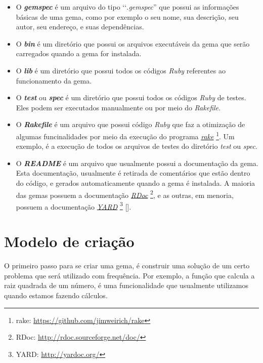 \begin{itemize}

 \item O \emph{\textbf{gemspec}} é um arquivo do tipo ‘‘\emph{.gemspec}'' que possui as informações básicas
 de uma gema, como por exemplo o seu nome, sua descrição, seu autor, seu endereço, e suas dependências.

 \item O \emph{\textbf{bin}} é um diretório que possui os arquivos executáveis da gema que serão
 carregados quando a gema for instalada.

 \item O \emph{\textbf{lib}} é um diretório que possui todos os códigos \emph{Ruby} referentes ao
 funcionamento da gema.

 \item O \emph{\textbf{test}} ou \emph{\textbf{spec}} é um diretório que possui todos os códigos \emph{Ruby}
 de testes. Eles podem ser executados manualmente ou por meio do \emph{Rakefile}.

 \item O \emph{\textbf{Rakefile}} é um arquivo que possui código \emph{Ruby} que faz a otimização de algumas
 funcinalidades por meio da execução do programa \emph{\href{https://github.com/jimweirich/rake}{rake}}
\footnote{rake: \url{https://github.com/jimweirich/rake}}. Um exemplo, é a execução de todos os arquivos
de testes do diretório \emph{test} ou \emph{spec}.

 \item O \emph{\textbf{README}} é um arquivo que usualmente possui a documentação da gema. Esta
 documentação, usualmente é retirada de comentários que estão dentro do código, e gerados automaticamente
 quando a gema é instalada. A maioria das gemas possuem a documentação
 \emph{\href{http://rdoc.sourceforge.net/doc/}{RDoc}} \footnote{RDoc: \url{http://rdoc.sourceforge.net/doc/}},
 e as outras, em menoria, possuem a documentação \emph{\href{http://yardoc.org/}{YARD}}
 \footnote{YARD: \url{http://yardoc.org/}} [].

\end{itemize}


\section{Modelo de criação}
\label{section:modelo_de_criação}

O primeiro passo para se criar uma gema, é construir uma solução de um certo problema que será utilizado
com frequência. Por exemplo, a função que calcula a raiz quadrada de um número, é uma funcionalidade que
usualmente utilizamos quando estamos fazendo cálculos.

